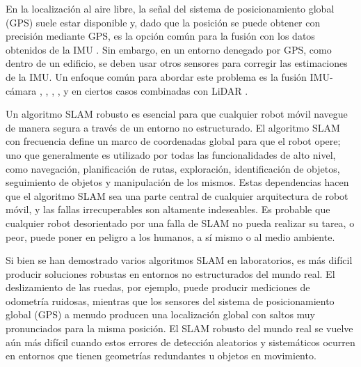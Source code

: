 En la localización al aire libre, la señal del sistema de posicionamiento global (GPS) suele estar disponible y, dado que la posición se puede obtener con precisión mediante GPS, es la opción común para la fusión con los datos obtenidos de la IMU \cite{engel2014}. Sin embargo, en un entorno denegado por GPS, como dentro de un edificio, se deben usar otros sensores para corregir las estimaciones de la IMU. Un enfoque común para abordar este problema es la fusión IMU-cámara \cite{mirzaei2008}, \cite{hesch2009}, \cite{chambers2014}, \cite{hesch2013}, y en ciertos casos combinadas con LiDAR \cite{lee2016}.

Un algoritmo SLAM robusto es esencial para que cualquier robot móvil navegue de manera segura a través de un entorno no estructurado. El algoritmo SLAM con frecuencia define un marco de coordenadas global para que el robot opere; uno que generalmente es utilizado por todas las funcionalidades de alto nivel, como navegación, planificación de rutas, exploración, identificación de objetos, seguimiento de objetos y manipulación de los mismos. Estas dependencias hacen que el algoritmo SLAM sea una parte central de cualquier arquitectura de robot móvil, y las fallas irrecuperables son altamente indeseables. Es probable que cualquier robot desorientado por una falla de SLAM no pueda realizar su tarea, o peor, puede poner en peligro a los humanos, a sí mismo o al medio ambiente.

Si bien se han demostrado varios algoritmos SLAM en laboratorios, es más difícil producir soluciones robustas en entornos no estructurados del mundo real. El deslizamiento de las ruedas, por ejemplo, puede producir mediciones de odometría ruidosas, mientras que los sensores del sistema de posicionamiento global (GPS) a menudo producen una localización global con saltos muy pronunciados para la misma posición. El SLAM robusto del mundo real se vuelve aún más difícil cuando estos errores de detección aleatorios y sistemáticos ocurren en entornos que tienen geometrías redundantes u objetos en movimiento.